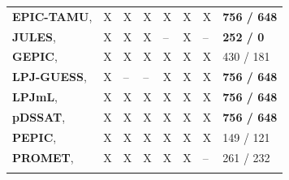 \documentclass[gmdd]{copernicus} %
\begin{document}
\begin{table}[ht]
\begin{tabular}{p{6cm} p{1cm} p{1cm} p{1cm} p{1cm} p{1cm} p{1cm} p{1.9cm}}
        \textbf{EPIC-TAMU}, \citet{Izaurralde06}               & X & X & X & X & X & X & \textbf{756 / 648} \\ \middlehline
        \textbf{JULES},     \citet{Osborne2015, Williams2015, Williams2017} & X & X & X & -- & X & -- & \textbf{252 / 0}\\ \middlehline
        \textbf{GEPIC},     \citet{LIU2007478, FOLBERTH201221} & X & X & X & X & X & X & 430 / 181\\ \middlehline
        \textbf{LPJ-GUESS}, \citet{Lindeskog2013, Olin2015}    & X & -- & -- & X & X & X & \textbf{756 / 648}\\  \middlehline
        \textbf{LPJmL},     \citet{von_Bloh_implementing_2018} & X & X & X & X & X & X & \textbf{756 / 648}\\ \middlehline
        \textbf{pDSSAT},    \citet{Elliott2014b, JONES2003235} & X & X & X & X & X & X & \textbf{756 / 648}\\ \middlehline
        \textbf{PEPIC},     \citet{LIU2016164, LIU2016}        & X & X & X & X & X & X & 149 / 121\\ \middlehline
        \textbf{PROMET},    \citet{Hank2015, MAUSER2015, Zabel2019}  & X & X & X & X & X & -- & 261 / 232\\
        \bottomhline
    \end{tabular}
\end{table}
\end{document}
